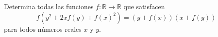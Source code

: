 Determina todas las funciones $f : \mathbb{R} \to \mathbb{R}$ que satisfacen 
\[f (y^2 + 2xf (y) + f (x)^2) = (y + f (x))(x + f (y))\]
para todos números reales $x$ y $y$.
